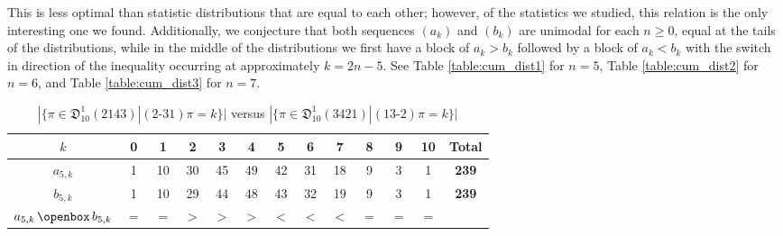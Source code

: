 \documentclass[
final
]{dmtcs-episciences}
\theoremstyle{definition}
\theoremstyle{remark}
\begin{document}
This is less optimal than statistic distributions that are equal to each other; however, of the statistics we studied, this relation is the only interesting one we found. Additionally, we conjecture that both sequences $(a_k)$ and $(b_k)$ are unimodal for each $n\ge 0$, equal at the tails of the distributions, while in the middle of the distributions we first have a block of $a_k > b_k$ followed by a block of $a_k < b_k$ with the switch in direction of the inequality occurring at approximately $k=2n-5$.  See Table \vref{table:cum_dist1} for $n=5$, Table \vref{table:cum_dist2} for $n=6$, and Table \vref{table:cum_dist3} for $n=7$.


\begin{table}[!h]
\begin{center}
\begin{tabular}{c||c|c|c|c|c|c|c|c|c|c|c||c}
	$k$  &0 & 1 & 2 & 3 & 4 & 5 & 6 & 7 & 8 &9 &10 & \textbf{Total}\\
	\hline 
	$a_{5,k}$ & 1 & 10 & 30 & 45 & 49 & 42 & 31 & 18 & 9 & 3 & 1 & \textbf{239}\\
	\hline
	$b_{5,k}$ & 1 & 10 & 29 & 44 & 48 & 43 & 32 & 19 & 9 & 3 & 1 & \textbf{239}\\
	\hline
	$a_{5,k} \, \openbox \, b_{5,k}$ & $=$ & $=$ & $>$ & $>$ & $>$ & $<$ & $<$ & $<$ & $=$ & $=$ & $=$
\end{tabular}
\caption{$|\{\pi \in \mathfrak{D}^1_{10} (2143) | (2\text{-}31)\pi = k\}|$ versus $|\{\pi \in \mathfrak{D}^1_{10} (3421) | (13\text{-}2)\pi = k\}|$}
\label{table:cum_dist1}
\end{center}
\end{table}

\end{document}
